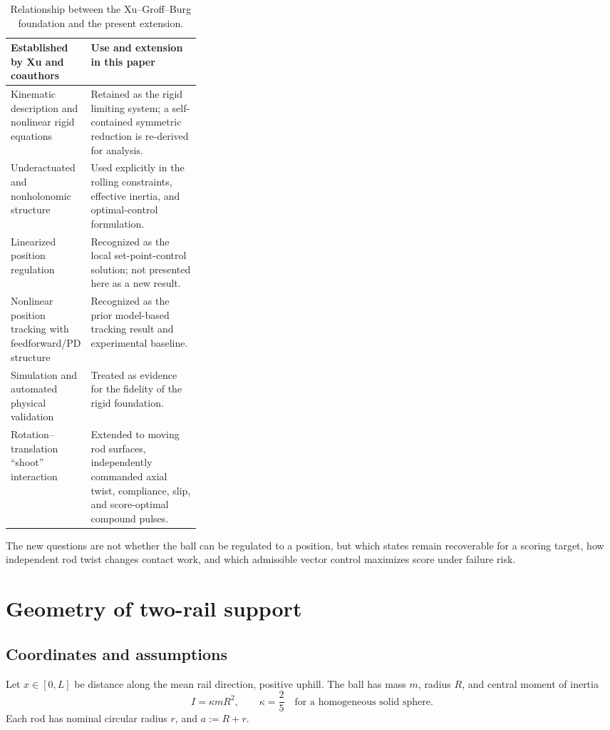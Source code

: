 \documentclass[11pt]{article}
\numberwithin{equation}{section}
\theoremstyle{definition}
\theoremstyle{remark}
\begin{document}
\begin{table}[h]
\centering
\caption{Relationship between the Xu--Groff--Burg foundation and the present extension.}
\label{tab:provenance}
\begin{tabularx}{\linewidth}{@{}p{0.31\linewidth}X@{}}
\toprule
\textbf{Established by Xu and coauthors} & \textbf{Use and extension in this paper} \\
\midrule
Kinematic description and nonlinear rigid equations & Retained as the rigid limiting system; a self-contained symmetric reduction is re-derived for analysis. \\
Underactuated and nonholonomic structure & Used explicitly in the rolling constraints, effective inertia, and optimal-control formulation. \\
Linearized position regulation & Recognized as the local set-point-control solution; not presented here as a new result. \\
Nonlinear position tracking with feedforward/PD structure & Recognized as the prior model-based tracking result and experimental baseline. \\
Simulation and automated physical validation & Treated as evidence for the fidelity of the rigid foundation. \\
Rotation--translation ``shoot'' interaction & Extended to moving rod surfaces, independently commanded axial twist, compliance, slip, and score-optimal compound pulses. \\
\bottomrule
\end{tabularx}
\end{table}

The new questions are not whether the ball can be regulated to a position, but which states remain recoverable for a scoring target, how independent rod twist changes contact work, and which admissible vector control maximizes score under failure risk.

\section{Geometry of two-rail support}

\subsection{Coordinates and assumptions}

Let $x\in[0,L]$ be distance along the mean rail direction, positive uphill.  The ball has mass $m$, radius $R$, and central moment of inertia
\begin{equation}
  I=\kappa mR^2,
  \qquad \kappa=\frac25
  \quad\text{for a homogeneous solid sphere}.
  \label{eq:inertia}
\end{equation}
Each rod has nominal circular radius $r$, and $a:=R+r$.
\end{document}

